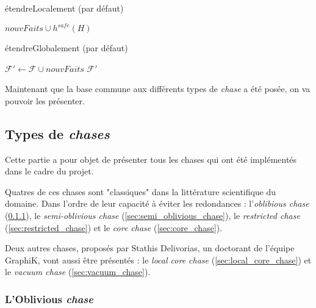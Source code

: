 \begin{algorithm}[H]\label{algo:etendre_local_defaut}
\caption{étendreLocalement (par défaut)}
\SetAlgoLined
\DontPrintSemicolon
{}
    \Return $nouvFaits \cup h^{safe}(H)$\;
\end{algorithm}

\begin{algorithm}[H]\label{algo:etendre_general}
\caption{étendreGlobalement (par défaut)}
\SetAlgoLined
\DontPrintSemicolon
{}
    $\mathcal{F'} \gets \mathcal{F} \cup nouvFaits$\;
    \Return $\mathcal{F'}$
\end{algorithm}

Maintenant que la base commune aux différents types de \textit{chase} a été posée, on va pouvoir les présenter.

\subsection{Types de \textit{chases}}\label{subsec:types_chases}

Cette partie a pour objet de présenter tous les chases qui ont été implémentés dans le cadre du projet.
\par Quatres de ces chases sont "classiques" dans la littérature scientifique du domaine. Dans l'ordre de leur capacité à éviter les redondances : l'\textit{oblibious chase} (\ref{sec:oblivious_chase}), le \textit{semi-oblivious chase} (\ref{sec:semi_oblivious_chase}), le \textit{restricted chase} (\ref{sec:restricted_chase}) et le \textit{core chase} (\ref{sec:core_chase}). 
\par Deux autres chases, proposés par Stathis Delivorias, un doctorant de l'équipe GraphiK, vont aussi être présentés : le \textit{local core chase} (\ref{sec:local_core_chase}) et le \textit{vacuum chase} (\ref{sec:vacuum_chase}).

\subsubsection{L'Oblivious \textit{chase}}\label{sec:oblivious_chase}

